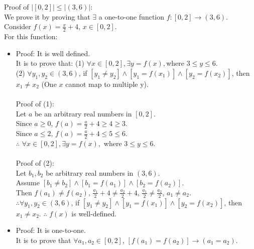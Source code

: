 \documentclass[12pt]{exam}
\begin{document}
\begin{solution}
    \begin{qparts}
        \item Proof of $|[0,2]| \leq |(3,6)|$:\\
        We prove it by proving that $\exists$ a one-to-one function $f: [0,2] \rightarrow (3,6)$.
        \\ Consider $f(x) = \frac{x}{2} + 4$, $x \in [0,2]$.\\
        For this function:
        \begin{itemize}
            \item Proof: It is well defined.
            \\It is to prove that: (1) $\forall x \in [0,2], \exists y = f(x), $where $ 3 \leq y \leq 6$.\\
            (2) $\forall y_1, y_2 \in (3,6)$, if 
            $[y_1 \not = y_2] \land [y_1 = f(x_1)] \land [y_2 = f(x_2)]$, then $x_1 \not = x_2$ (One $x$ cannot map to multiple y).
            \\\\
            Proof of (1):\\
            Let $a$ be an arbitrary real numbers in $[0,2]$.\\
            Since $a \geq 0$, $f(a) = \frac{a}{2} + 4 \geq 4 \geq 3$.\\
            Since $a \leq 2$, $f(a) = \frac{a}{2} + 4 \leq 5 \leq 6$.\\
            $\therefore$ $\forall x \in [0,2], \exists y = f(x), $ where $3 \leq y \leq 6$.\\\\
            Proof of (2): \\
            Let $b_1, b_2$ be arbitrary real numbers in $(3,6)$.\\
            Assume $[b_1 \not = b_2] \land [b_1 = f(a_1)] \land [b_2 = f(a_2)]$.
            \\Then $f(a_1) \not = f(a_2)$, $\frac{a_1}{2} + 4 \not = \frac{a_2}{2} +4$, $\frac{a_1}{2} \not = \frac{a_2}{2}$, $a_1 \not = a_2$.\\
            $\therefore \forall y_1, y_2 \in (3,6)$, if 
            $[y_1 \not = y_2] \land [y_1 = f(x_1)] \land [y_2 = f(x_2)]$, then $x_1 \not = x_2$.
            $\therefore$ $f(x)$ is well-defined. 
            \item Proof: It is one-to-one.\\
            It is to prove that $\forall a_1, a_2 \in [0,2]$, $[f(a_1) = f(a_2)]\rightarrow (a_1 = a_2)$.\\

\end{itemize}
\end{qparts}
\end{solution}
\end{document}
